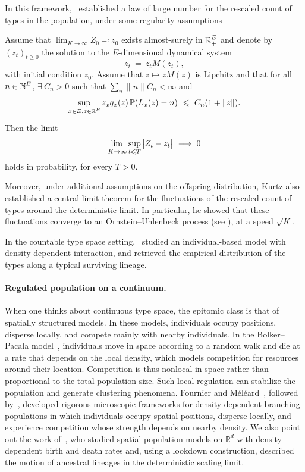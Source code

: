 In this framework,~\cite{Kurtz:1978aa} established a law of large number for the rescaled count of types in the population, under some regularity assumptions 
\begin{prop}{\citet[Theorem~2.2]{Kurtz:1978aa}}
  Assume that $\lim_{K\to\infty}Z_0\eqqcolon z_0$ exists almost-surely in $\operatorname{\mathbb{R}}_+^E$ and denote by
  $(z_t)_{t\geq 0}$ the solution to the $E$-dimensional dynamical system 
  \begin{equation*}
\dot z_t\ =\ z_t M(z_t),
\end{equation*}
with initial condition $z_0$.
Assume that $z\mapsto zM(z)$ is Lipchitz and that for all $n\in\operatorname{\mathbb{N}}^E$, $\exists\ C_n>0$ such that $\sum_n \lVert n\rVert C_n<\infty$ and
\[
\sup_{x\in E, z\in \operatorname{\mathbb{R}}_+^E} z_x q_x(z) \operatorname{\mathbb{P}}(L_x(z)=n)\ \leqslant\ C_n(1+ \lVert z\rVert).
\]
Then the limit
\[
\adjustlimits{\lim}_{K\to\infty}{\sup}_{t\leq T} \big|Z_t-z_t\big| \ \longrightarrow\ 0
\]
holds in probability, for every $T>0$.
\end{prop}
Moreover, under additional assumptions on the offspring distribution, Kurtz also established a central limit theorem for the fluctuations of the rescaled count of types around the deterministic limit. In particular, he showed that these fluctuations converge to an Ornstein--Uhlenbeck process (see \cite[Theorem 4.4]{Kurtz:1978aa}), at a speed $\sqrt{K}$.

 In the countable type space setting,~\citet{Bansaye} studied an individual-based model with density-dependent interaction, and retrieved 
the empirical distribution of the types along a typical surviving lineage.

\paragraph{Regulated population on a continuum.}


When one thinks about continuous type space, the epitomic class is that of spatially structured models. In these models, individuals occupy positions, disperse locally, and compete mainly with nearby individuals. In the Bolker--Pacala model~\cite{bolker1997using}, individuals move in space according to a random walk and die at a rate that depends on the local density, which models competition for resources around their location. Competition is thus nonlocal in space rather than proportional to the total population size. Such local regulation can stabilize the population and generate clustering phenomena. Fournier and Méléard~\cite{Fournier_2004}, followed by~\citet{Champagnat_2006}, developed rigorous microscopic frameworks for density-dependent branching populations in which individuals occupy spatial positions, disperse locally, and experience competition whose strength depends on nearby density. We also point out the work of~\citet{alison_m_etheridge_looking_2024}, who studied spatial population models on $\mathbb{R}^d$ with density-dependent birth and death rates and, using a lookdown construction, described the motion of ancestral lineages in the deterministic scaling limit.

